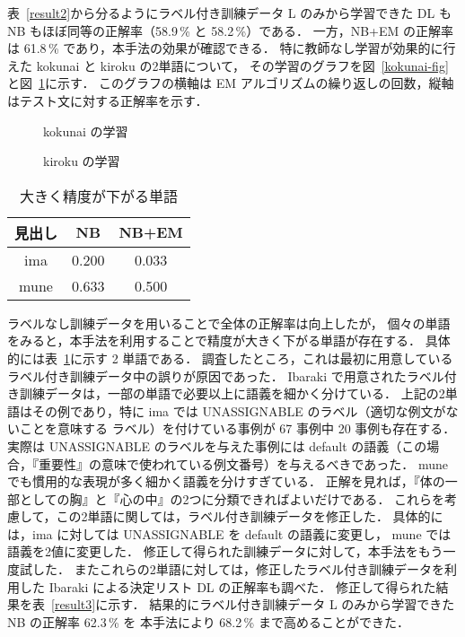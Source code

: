 \mbox{表 \ref{result2}}から分るようにラベル付き訓練データ L のみから学習できた
DL も NB もほぼ同等の正解率（58.9\,\% と 58.2\,\%）である．
一方，NB+EM の正解率は 61.8\,\% であり，本手法の効果が確認できる．
特に教師なし学習が効果的に行えた kokunai と kiroku の2単語について，
その学習のグラフを\mbox{図 \ref{kokunai-fig}}と\mbox{図 \ref{kiroku-fig}}に示す．
このグラフの横軸は EM アルゴリズムの繰り返しの回数，縦軸はテスト文に対する正解率を示す．

\begin{figure}[htbp]
\begin{minipage}[t]{70mm}
  \begin{center}
	\epsfxsize=63.5mm
  \end{center}
\caption{kokunai の学習}\label{kokunai-fig}
\end{minipage}
\hfill
\begin{minipage}[t]{70mm}
  \begin{center}
	\epsfxsize=63.5mm
  \end{center}
\caption{kiroku の学習}\label{kiroku-fig}
\end{minipage}
\end{figure}

\begin{table}[htbp]
  \begin{center}
    \leavevmode
    \caption{大きく精度が下がる単語}\label{badword}
    \begin{tabular}{|c|c|c|} \hline
見出し    &  NB  & NB+EM \\ \hline
ima       &  0.200    &  0.033     \\ 
mune      &  0.633    &  0.500     \\ \hline
    \end{tabular}
  \end{center}
\end{table}

ラベルなし訓練データを用いることで全体の正解率は向上したが，
個々の単語をみると，本手法を利用することで精度が大きく下がる単語が存在する．
具体的には\mbox{表 \ref{badword}}に示す 2 単語である．
調査したところ，これは最初に用意しているラベル付き訓練データ中の誤りが原因であった．
Ibaraki で用意されたラベル付き訓練データは，一部の単語で必要以上に語義を細かく分けている．
上記の2単語はその例であり，特に ima では UNASSIGNABLE のラベル（適切な例文がないことを意味する
ラベル）を付けている事例が 67 事例中 20 事例も存在する．
実際は UNASSIGNABLE のラベルを与えた事例には 
default の語義（この場合，『重要性』の意味で使われている例文番号）を与えるべきであった．
mune でも慣用的な表現が多く細かく語義を分けすぎている．
正解を見れば，『体の一部としての胸』と『心の中』の2つに分類できればよいだけである．
これらを考慮して，この2単語に関しては，ラベル付き訓練データを修正した．
具体的には，ima に対しては UNASSIGNABLE を default の語義に変更し，
mune では語義を2値に変更した．
修正して得られた訓練データに対して，本手法をもう一度試した．
またこれらの2単語に対しては，修正したラベル付き訓練データを利用した
Ibaraki による決定リスト DL の正解率も調べた．
修正して得られた結果を\mbox{表 \ref{result3}}に示す．
結果的にラベル付き訓練データ L  のみから学習できた NB の正解率 62.3\,\% を
本手法により 68.2\,\% まで高めることができた．

